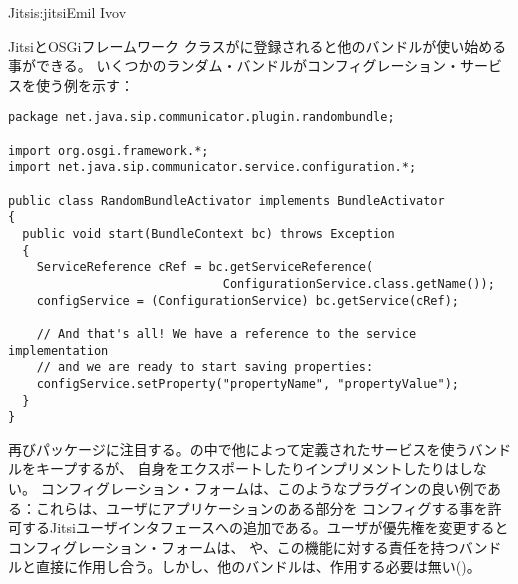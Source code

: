 \begin{aosachapter}{Jitsi}{s:jitsi}{Emil Ivov}
\begin{aosasect1}{JitsiとOSGiフレームワーク}
\noindent {}クラスがに登録されると他のバンドルが使い始める事ができる。
いくつかのランダム・バンドルがコンフィグレーション・サービスを使う例を示す：

\begin{verbatim}
package net.java.sip.communicator.plugin.randombundle;

import org.osgi.framework.*;
import net.java.sip.communicator.service.configuration.*;

public class RandomBundleActivator implements BundleActivator
{
  public void start(BundleContext bc) throws Exception
  {
    ServiceReference cRef = bc.getServiceReference(
                              ConfigurationService.class.getName());
    configService = (ConfigurationService) bc.getService(cRef);

    // And that's all! We have a reference to the service implementation
    // and we are ready to start saving properties:
    configService.setProperty("propertyName", "propertyValue");
  }
}
\end{verbatim}

\noindent 再びパッケージに注目する。の中で他によって定義されたサービスを使うバンドルをキープするが、
自身をエクスポートしたりインプリメントしたりはしない。
コンフィグレーション・フォームは、このようなプラグインの良い例である：これらは、ユーザにアプリケーションのある部分を
コンフィグする事を許可するJitsiユーザインタフェースへの追加である。ユーザが優先権を変更するとコンフィグレーション・フォームは、
や、この機能に対する責任を持つバンドルと直接に作用し合う。しかし、他のバンドルは、作用する必要は無い()。


\end{aosasect1}
\end{aosachapter}
